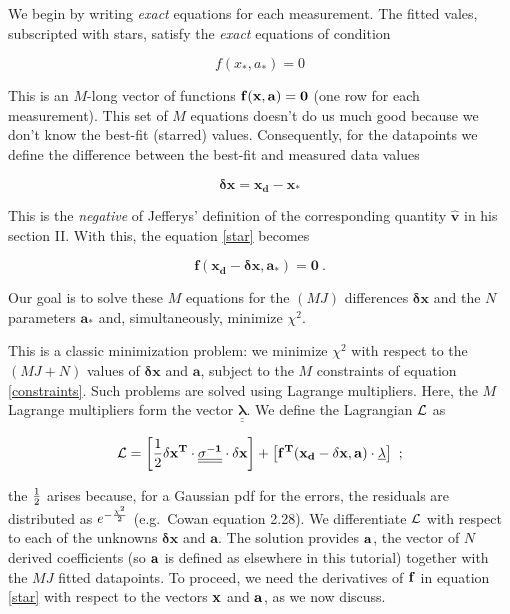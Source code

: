 \documentclass[psfig,preprint]{aastex}
\begin{document}
We begin by writing {\it exact} equations for each measurement. The
fitted vales, subscripted with stars, satisfy the {\it exact} equations
of condition

\begin{mathletters} 
{\boldmath
\begin{equation} \label{star}
f(x_*, a_*) = 0
\end{equation}
}

\noindent This is an $M$-long vector of functions ${\bf f(x, a)= 0}$
(one row for each measurement). This set of $M$ equations doesn't do us
much good because we don't know the best-fit (starred)
values. Consequently, for the datapoints we define the difference
between the best-fit and measured data values

\begin{equation} 
\mathbf {\delta x = x_d - x_*} 
\end{equation}


\noindent This is the {\it negative} of Jefferys' definition of the
corresponding quantity $\mathbf {\hat{v}}$ in his section II. 
With this, the equation \ref{star} becomes

\begin{equation}  \label{constraints}
\mathbf{ f(x_d - \delta x, a_*) = 0} \ .
\end{equation}
\end{mathletters}

\noindent Our goal is to solve these $M$ equations for the $(MJ)$
differences $\mathbf {\delta x}$ and the $N$ parameters $\mathbf {a_*}$
and, simultaneously, minimize $\chi^2$.

This is a classic minimization problem: we minimize
$\chi^2$ with respect to the $(MJ + N)$ values of $\mathbf{\delta x}$ and
$\mathbf{a}$, subject to the $M$ constraints of equation
\ref{constraints}. Such problems are solved using Lagrange
multipliers. Here, the $M$ Lagrange multipliers form the vector $\mathbf
\underline{\underline{\lambda}}$. We define the Lagrangian $\cal L$ as

\begin{equation}
{\cal L} = \left[ {1 \over 2} \mathbf {\delta x^T \cdot 
\underline{\underline{\sigma^{-1}}} \cdot \delta x}\right] +
 \left[ \mathbf {f^T(x_d - \delta x, a) \cdot \underline{\lambda}} \right] \ ;
\end{equation}

\noindent the $1 \over 2$ arises because, for a Gaussian pdf for the
errors, the residuals are distributed as $e^{-{\chi^2 \over 2}}$ (e.g.\
Cowan equation 2.28).  We differentiate $\cal L$ with respect to each of
the unknowns $\mathbf {\delta x}$ and $\mathbf a$.  The solution
provides $\bf a$, the vector of $N$ derived coefficients (so $\bf a$ is
defined as elsewhere in this tutorial) together with the $MJ$ fitted
datapoints.  To proceed, we need the derivatives of $\bf f$ in equation
\ref{star} with respect to the vectors $\bf x$ and $\bf a$, as we now
discuss.
\end{document}
